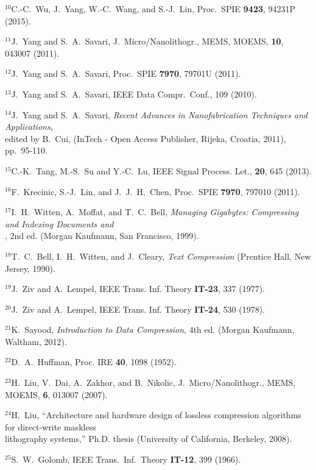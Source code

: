\documentclass{article}
\begin{document}
\noindent $^{10}$C.-C.~Wu, J.~Yang, W.-C.~Wang, and S.-J.~Lin,
Proc.~SPIE {\bf 9423}, 94231P (2015).

\noindent $^{11}$J.~Yang and S.~A.~Savari, 
J.~Micro/Nanolithogr., MEMS, MOEMS, {\bf 10}, 043007 (2011).

\noindent $^{12}$J.~Yang and S.~A.~Savari, 
Proc.~SPIE {\bf 7970}, 79701U (2011).

\noindent $^{13}$J.~Yang and S.~A.~Savari, 
IEEE Data Compr.~Conf., 109 (2010).

\noindent $^{14}$J.~Yang and S.~A.~Savari, 
{\em Recent Advances in Nanofabrication Techniques and Applications}, \\
\indent edited by B.~Cui, (InTech - Open Access Publisher, Rijeka, Croatia, 
2011), pp.~95-110.

\noindent $^{15}$C.-K.~Tang, M.-S.~Su and Y.-C.~Lu, 
IEEE Signal Process. Let., {\bf 20}, 645 (2013).

\noindent $^{16}$F.~Krecinic, S.-J.~Lin, and J.~J.~H.~Chen, 
Proc.~SPIE {\bf 7970}, 797010 (2011).

\noindent $^{17}$I.~H.~Witten, A.~Moffat, and T.~C.~Bell, 
{\em Managing Gigabytes: Compressing and Indexing Documents and} \\
, 2nd ed. (Morgan Kaufmann, San Francisco, 1999).

\noindent $^{18}$T.~C.~Bell, I.~H.~Witten, and J.~Cleary, 
{\em Text Compression} (Prentice Hall, New Jersey, 1990).

\noindent $^{19}$J.~Ziv and A.~Lempel,
IEEE Trans. Inf. Theory {\bf IT-23}, 337 (1977).

\noindent $^{20}$J.~Ziv and A.~Lempel,
IEEE Trans. Inf. Theory {\bf IT-24}, 530 (1978).

\noindent $^{21}$K.~Sayood, {\em Introduction to Data Compression},
4th ed. (Morgan Kaufmann, Waltham, 2012).

\noindent $^{22}$D.~A.~Huffman, Proc. IRE {\bf 40}, 1098 (1952).

\noindent $^{23}$H.~Liu, V.~Dai, A.~Zakhor, and B.~Nikolic,
J.~Micro/Nanolithogr., MEMS, MOEMS, {\bf 6}, 013007 (2007).

\noindent $^{24}$H.~Liu, ``Architecture and hardware design of lossless 
compression algorithms for direct-write maskless \\
\indent lithography systems,'' Ph.D. thesis (University of California, 
Berkeley, 2008).

\noindent $^{25}$S.~W.~Golomb, IEEE Trans.~Inf.~Theory {\bf IT-12}, 399
(1966).
\end{document}
